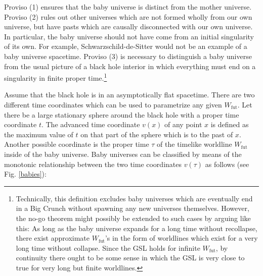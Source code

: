 \documentclass{article}
\begin{document}
Proviso (1) ensures that the baby universe is distinct from the mother universe.  Proviso (2) rules out other universes which are not formed wholly from our own universe, but have pasts which are causally disconnected with our own universe.  In particular, the baby universe should not have come from an initial singularity of its own.  For example, Schwarzschild-de-Sitter would not be an example of a baby universe spacetime.  Proviso (3) is necessary to distinguish a baby universe from the usual picture of a black hole interior in which everything must end on a singularity in finite proper time.\footnote{Technically, this definition excludes baby universes which are eventually end in a Big Crunch without spawning any new universes themselves.  However, the no-go theorem might possibly be extended to such cases by arguing like this: As long as the baby universe expands for a long time without recollapse, there exist approximate $W_\mathrm{fut}$'s in the form of worldlines which exist for a very long time without collapse.  Since the GSL holds for infinite $W_\mathrm{fut}$, by continuity there ought to be some sense in which the GSL is very close to true for very long but finite worldlines.}

Assume that the black hole is in an asymptotically flat spacetime.  There are two different time coordinates which can be used to parametrize any given $W_\mathrm{fut}$.  Let there be a large stationary sphere around the black hole with a proper time coordinate $t$.  The advanced time coordinate $v(x)$ of any point $x$ is defined as the maximum value of $t$ on that part of the sphere which is to the past of $x$.  Another possible coordinate is the proper time $\tau$ of the timelike worldline $W_\mathrm{fut}$ inside of the baby universe.  Baby universes can be classified by means of the monotonic relationship between the two time coordinates $v(\tau)$ as follows (see Fig. \ref{babies}):
\end{document}
